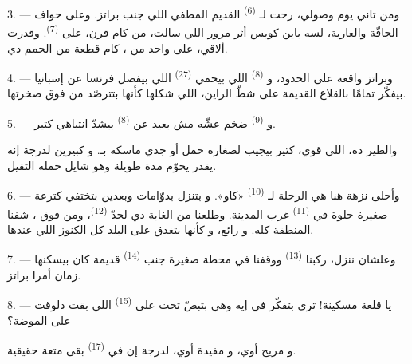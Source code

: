 \VUsaut{3.0mm}
\VUsaut{3.0mm}

3. --- ومن تاني يوم وصولي، رحت لـ \textsuperscript{(6)} القديم
المطفي اللي جنب براتز. وعلى حواف  الجافّة والعارية، لسه باين كويس
أثر مرور  اللي سالت، من كام قرن، على 
\textsuperscript{(7)}. وقدرت ألاقي، على واحد من ، كام قطعة من الحمم دي.

4. --- وبراتز واقعة على الحدود، و \textsuperscript{(8)} اللي بيحمي
 \textsuperscript{(27)} اللي بيفصل فرنسا عن إسبانيا بيفكّر تمامًا
بالقلاع القديمة على شطّ الراين، اللي شكلها كأنها بتترصّد  من فوق
صخرتها.

5. --- و \textsuperscript{(9)} ضخم عشّه مش بعيد عن 
\textsuperscript{(8)} بيشدّ انتباهي كتير.

والطير  ده، اللي  قوي، كتير بيجيب لصغاره حمل أو جدي
ماسكه بـ. و كبيرين لدرجة إنه يقدر يحوّم مدة طويلة
وهو شايل حمله التقيل.

\VUsaut{3.0mm}
\VUsaut{3.0mm}

6. --- وأحلى نزهة هنا هي الرحلة لـ \textsuperscript{(10)} «كاو».
و بتنزل بدوّامات وبعدين بتختفي كترعة صغيرة حلوة في
 \textsuperscript{(11)} غرب المدينة. وطلعنا من الغابة دي لحدّ
 \textsuperscript{(12)}، ومن فوق ، شفنا
 المنطقة كله. و رائع، و كأنها بتغدق
على البلد كل الكنوز اللي عندها.

7. --- وعلشان ننزل، ركبنا  \textsuperscript{(13)} ووقفنا في محطة
صغيرة جنب  \textsuperscript{(14)}  قديمة كان
بيسكنها زمان أمرا براتز.

8. --- يا قلعة مسكينة! ترى بتفكّر في إيه وهي بتبصّ تحت على 
 \textsuperscript{(15)} اللي بقت دلوقت  على الموضة؟

و مريح أوي، و مفيدة أوي، لدرجة إن
 في  \textsuperscript{(17)} بقى متعة حقيقية.

\VUsaut{3.0mm}
\VUsaut{3.0mm}

